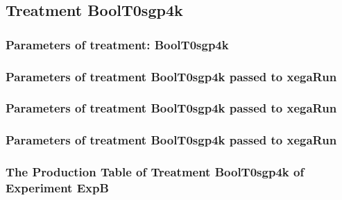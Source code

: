 \documentclass[18pt,c]{beamer}
\makeatletter
\def\beamer@writeslidentry@miniframesoff{%
  \expandafter\beamer@ifempty\expandafter{\beamer@framestartpage}{}%
  {%
   \clearpage\beamer@notesactions%
  }
}
\newcommand*{\miniframesoff}{\let\beamer@writeslidentry=\beamer@writeslidentry@miniframesoff}
\makeatother
\begin{document}
\miniframesoff
\subsection{Treatment BoolT0sgp4k}

 \begin{frame}
 \fontsize{8pt}{9pt}\selectfont
 \frametitle{  Parameters of treatment: BoolT0sgp4k 
 }

 \label{ExpBtParmTable008.tex}  
 \end{frame}


 \begin{frame}
 \fontsize{8pt}{9pt}\selectfont
 \frametitle{  Parameters of treatment BoolT0sgp4k passed to xegaRun
 }

 \label{ExpBtParmTable009.tex}  
 \end{frame}


 \begin{frame}
 \fontsize{8pt}{9pt}\selectfont
 \frametitle{  Parameters of treatment BoolT0sgp4k passed to xegaRun
 }

 \label{ExpBtParmTable010.tex}  
 \end{frame}


 \begin{frame}
 \fontsize{8pt}{9pt}\selectfont
 \frametitle{  Parameters of treatment BoolT0sgp4k passed to xegaRun
 }

 \label{ExpBtParmTable011.tex}  
 \end{frame}

 \begin{frame}
 \fontsize{8pt}{9pt}\selectfont
 \frametitle{ The Production Table of Treatment BoolT0sgp4k of Experiment ExpB }

 \label{ExpBGrammarTable002.tex}  
 \end{frame}
\end{document}
